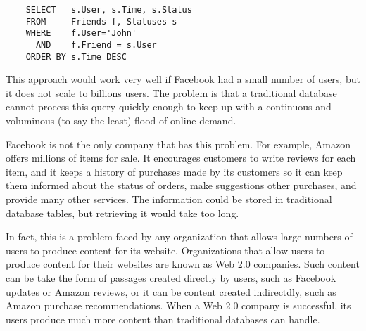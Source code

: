 \begin{verbatim}
	SELECT   s.User, s.Time, s.Status
	FROM     Friends f, Statuses s
	WHERE    f.User='John'
	  AND    f.Friend = s.User
	ORDER BY s.Time DESC
\end{verbatim}

This approach would work very well if Facebook had a small number of users,
but it does not scale to billions users.
The problem is that a traditional database cannot process
this query quickly enough to keep up with a continuous
and voluminous (to say the least) flood of online demand.

Facebook is not the only company that has this problem.
For example, Amazon 
offers millions of items for sale.
It encourages customers to write reviews for each item, and it keeps a history
of purchases made by its customers so it can keep them informed about the status of orders,
make suggestions other purchases, and provide many other services.
The information could be stored in traditional database tables,
but retrieving it would take too long.

In fact, this is a problem faced by any organization that
allows large numbers of users to produce content for its website.
Organizations that allow users to produce content for their websites
are known as Web 2.0 companies.
Such content can be take the form of passages created directly by users,
such as Facebook updates or Amazon reviews, or it can be content created
indirectdly, such as Amazon purchase recommendations.
When a Web 2.0 company is successful,
its users produce much more content than traditional databases can handle.

